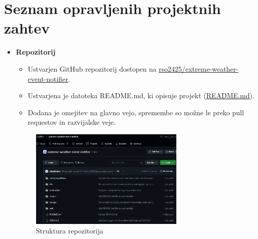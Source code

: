 \documentclass[a4paper,11pt]{article}
\begin{document}
\section*{Seznam opravljenih projektnih zahtev}
\begin{itemize}
	\item \textbf{Repozitorij}
	      
	      \begin{itemize}
	      	\item Ustvarjen GitHub repozitorij dostopen na \href{https://github.com/rso2425/extreme-weather-event-notifier}{rso2425/extreme-weather-event-notifier}.
	      	\item Ustvarjena je datoteka README.md, ki opisuje projekt (\href{https://github.com/rso2425/extreme-weather-event-notifier/blob/main/README.md}{README.md}).
	      	\item Dodana je omejitev na glavno vejo, spremembe so možne le preko pull requestov in razvijalske veje.
	      \end{itemize}
	      
	      \begin{figure}[ht!]
	      	\centering
	      	\includegraphics[width=0.7\textwidth]{images/repo.png}
	      	\caption{Struktura repozitorija}
	      	\label{fig:repo}
	      \end{figure}
	              

\end{itemize}
\end{document}
